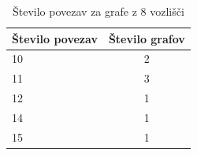\documentclass[12pt,a4paper]{amsart}
\theoremstyle{plain} %
\begin{document}
\begin{table}[h]
    \begin{center}
      \begin{tabular}{l|c} %
        \textbf{Število povezav} & \textbf{Število grafov} \\
        \hline
        10 & 2 \\
        11 & 3 \\
        12 & 1 \\
        14 & 1 \\
        15 & 1 \\
      \end{tabular}
    \end{center}
    \caption{Število povezav za grafe z 8 vozlišči}
    \label{tab:tabela1}
\end{table}
\end{document}
